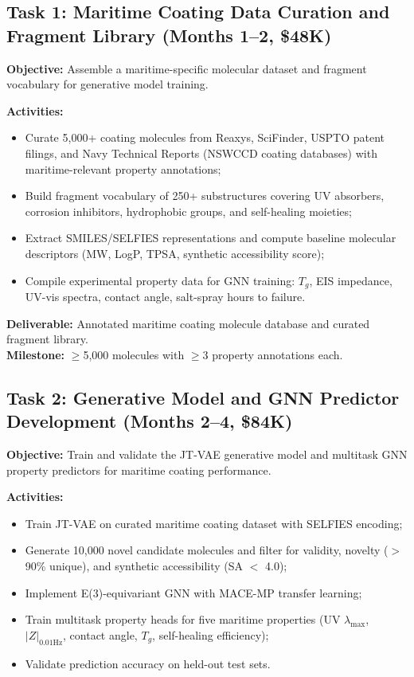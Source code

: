 \documentclass[11pt,letterpaper]{article}
\begin{document}
\subsection{Task 1: Maritime Coating Data Curation and Fragment Library
(Months 1--2, \$48K)}

\textbf{Objective:} Assemble a maritime-specific molecular dataset and fragment
vocabulary for generative model training.

\textbf{Activities:}
\begin{itemize}[nosep]
  \item Curate 5,000+ coating molecules from Reaxys, SciFinder, USPTO patent
    filings, and Navy Technical Reports (NSWCCD coating databases) with
    maritime-relevant property annotations;
  \item Build fragment vocabulary of 250+ substructures covering UV absorbers,
    corrosion inhibitors, hydrophobic groups, and self-healing moieties;
  \item Extract SMILES/SELFIES representations and compute baseline molecular
    descriptors (MW, LogP, TPSA, synthetic accessibility score);
  \item Compile experimental property data for GNN training: $T_g$, EIS
    impedance, UV-vis spectra, contact angle, salt-spray hours to failure.
\end{itemize}

\textbf{Deliverable:} Annotated maritime coating molecule database and curated
fragment library.\\
\textbf{Milestone:} $\geq$5,000 molecules with $\geq$3 property annotations each.

\subsection{Task 2: Generative Model and GNN Predictor Development
(Months 2--4, \$84K)}

\textbf{Objective:} Train and validate the JT-VAE generative model and multitask
GNN property predictors for maritime coating performance.

\textbf{Activities:}
\begin{itemize}[nosep]
  \item Train JT-VAE on curated maritime coating dataset with SELFIES encoding;
  \item Generate 10,000 novel candidate molecules and filter for validity,
    novelty ($>$90\% unique), and synthetic accessibility (SA $<$ 4.0);
  \item Implement E(3)-equivariant GNN with MACE-MP transfer learning;
  \item Train multitask property heads for five maritime properties
    (UV $\lambda_\text{max}$, $|Z|_{0.01\text{Hz}}$, contact angle, $T_g$,
    self-healing efficiency);
  \item Validate prediction accuracy on held-out test sets.
\end{itemize}
\end{document}

